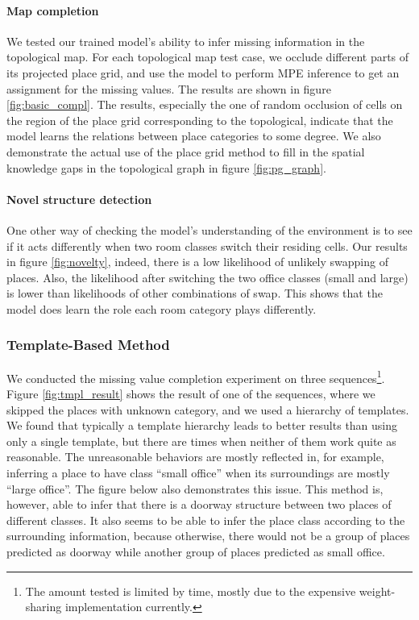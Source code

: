 \documentclass[11pt, titlepage]{article}
\theoremstyle{definition}
\begin{document}
\paragraph{Map completion} We tested our trained model's ability to infer missing information in the topological map. For each topological map test case, we occlude different parts of its projected place grid, and use the model to perform MPE inference to get an assignment for the missing values. The results are shown in figure \ref{fig:basic_compl}. The results, especially the one of random occlusion of cells on the region of the place grid corresponding to the topological, indicate that the model learns the relations between place categories to some degree. We also demonstrate the actual use of the place grid method to fill in the spatial knowledge gaps in the topological graph in figure \ref{fig:pg_graph}.

\paragraph{Novel structure detection} One other way of checking the model's understanding of the environment is to see if it acts differently when two room classes switch their residing cells. Our results in figure \ref{fig:novelty}, indeed, there is a low likelihood of unlikely swapping of places. Also, the likelihood after switching the two office classes (small and large) is lower than likelihoods of other combinations of swap. This shows that the model does learn the role each room category plays differently.

\subsubsection{Template-Based Method}

We conducted the missing value completion experiment on three sequences\footnote{The amount tested is limited by time, mostly due to the expensive weight-sharing implementation currently.}. Figure \ref{fig:tmpl_result} shows the result of one of the sequences, where we skipped the places with unknown category, and we used a hierarchy of templates. We found that typically a template hierarchy leads to better results than using only a single template, but there are times when neither of them work quite as reasonable. The unreasonable behaviors are mostly reflected in, for example, inferring a place to have class ``small office'' when its surroundings are mostly ``large office''. The figure below also demonstrates this issue. This method is, however, able to infer that there is a doorway structure between two places of different classes. It also seems to be able to infer the place class according to the surrounding information, because otherwise, there would not be a group of places predicted as doorway while another group of places predicted as small office.
\end{document}
